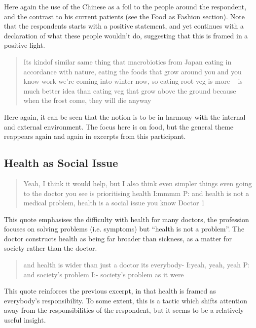 Here again the use of the Chinese as a foil to the people around the respondent, and the contrast to his current patients (see the Food as Fashion section). Note that the respondents starts with a positive statement, and yet continues with a declaration of what these people wouldn't do, suggesting that this is framed in a positive light. 

\begin{quotation}
  Its kindof similar same thing that macrobiotics from Japan eating in accordance with nature, eating the foods that grow around you and you know work we're coming into winter now, so eating root veg is more – is much better idea than eating veg that grow above the ground because when the frost come, they will die anyway

\end{quotation}

Here again, it can be seen that the notion is to be in harmony with the internal and external environment. The focus here is on food, but the general theme reappears again and again in excerpts from this participant. 

\subsection{Health as Social Issue}
\label{sec:health-as-social}


\begin{quotation}
  Yeah, I think it would help, but I also think even simpler things even going to the doctor you see is prioritising health
I:mmmm
P: and health is not a medical problem, health is a social issue you know
Doctor 1
\end{quotation}

This quote emphasises the difficulty with health for many doctors, the profession focuses on solving problems (i.e. symptoms) but ``health is not a problem''. The doctor constructs health as being far broader than sickness, as a matter for society rather than the doctor. 

\begin{quotation}
  and health is wider than just a doctor its everybody-
I:yeah, yeah, yeah
P: and society's problem 
I:- society's problem as it were

\end{quotation}

This quote reinforces the previous excerpt, in that health is framed as everybody's responsibility. To some extent, this is a tactic which shifts attention away from the responsibilities of the respondent, but it seems to be a relatively useful insight. 

